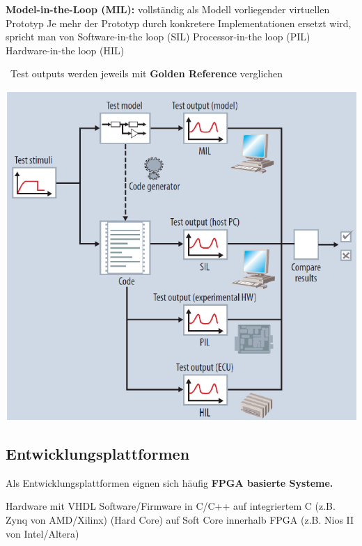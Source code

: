 \begin{outline}
    \1 \textbf{Model-in-the-Loop (MIL):} vollständig als Modell vorliegender virtuellen Prototyp
    \1 Je mehr der Prototyp durch konkretere Implementationen ersetzt wird, spricht man von
        \2 Software-in-the loop (SIL)
        \2 Processor-in-the loop (PIL)
        \2 Hardware-in-the loop (HIL)
\end{outline}

\vspace{0.2cm}

\textrightarrow\ Test outputs werden jeweils mit \textbf{Golden Reference} verglichen
\begin{center}
    \includegraphics[width=0.9\columnwidth]{images/x_in_loop_testing.png}
\end{center}


\subsection{Entwicklungsplattformen}

Als Entwicklungsplattformen eignen sich häufig \textbf{FPGA basierte Systeme.}

\begin{outline}
    \1 Hardware mit VHDL
    \1 Software/Firmware in C/C++
        \2 auf integriertem \micro C (z.B. Zynq von AMD/Xilinx) (Hard Core)
        \2 auf Soft Core innerhalb FPGA (z.B. Nios II von Intel/Altera)
\end{outline}

